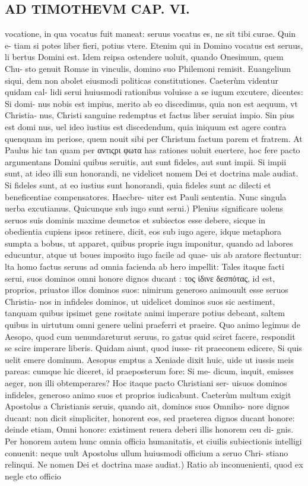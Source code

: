 \documentclass{article}
\begin{document}
\begin{pages}
\section*{AD TIMOTHEVM CAP. VI. }
\marginpar{[ p.119 ]}\pstart vocatione, in qua vocatus fuit maneat: seruus vocatus es, ne sit tibi curae. Quin e- tiam si potes liber fieri, potius vtere. Etenim qui in Domino vocatus est seruus, li bertus Domini est. Idem reipsa ostendere uoluit, quando Onesimum, quem Chu- sto genuit Romae in vinculis, domino suo Philemoni remisit. Euangelium siqui, dem non abolet eiusmodi politicas constitutiones. Caeterùm videntur quidam cal- lidi serui huiusmodi rationibus voluisse a se iugum excutere, dicentes: Si domi- nus nobis est impius, merito ab eo discedimus, quia non est aequum, vt Christia- nus, Christi sanguine redemptus et factus liber seruiat impio. Sin pius est domi nus, uel ideo iustius est discedendum, quia iniquum est agere contra quenquam im periose, quem nouit sibi per Christum factum parem et fratrem. At Paulus hic tan quam per αντιςρι φωτα has rationes uoluit euertere, hoc fere pacto argumentans Domini quibus seruitis, aut sunt fideles, aut sunt impii. Si impii sunt, at ideo illi sun honorandi, ne videlicet nomem Dei et doctrina male audiat. Si fideles sunt, at eo iustius sunt honorandi, quia fideles sunt ac dilecti et beneficentiae compensatores. Haecbre- uiter est Pauli sententia. Nunc singula uerba excutiamus.  \pend\pstart Quicunque sub iugo sunt serui.) Plenius significare uolens seruos suis dominis maxime deunctos et subiectos esse debere, sicque in obedientia cupiens ipsos retinere, dicit, eos sub iugo agere, idque metaphora sumpta a bobus, ut apparet, quibus proprie iugu imponitur, quando ad labores educuntur, atque ut boues imposito iugo facile ad quae- uis ab aratore flectuntur: lta homo factus seruus ad omnia facienda ab hero impellit: Tales itaque facti serui, suos dominos omni honore dignos ducant : τος ἰδινε δεσπότας, id est, proprios, priuatos illos dominos suos: nimirum generoso animouult esse seruos Christia- nos in infideles dominos, ut uidelicet dominos suos sic aestiment, tanquam quibus ipsimet gene rositate animi imperare potius debeant, saltem quibus in uirtutum omni genere uelini praeferri et praeire. Quo animo legimus de Aesopo, quod cum uenundareturut seruus, ro gatus quid sciret facere, respondit se scire imperare liberis. Quidam aiunt, quod iusse- rit praeconem edicere, Si quis uelit emere dominum. Aesopus emptus a Xeniade dixit huic, uide ut iussis meis pareas: cumque hic diceret, id praeposterum fore: Si me- dicum, inquit, emisses aeger, non illi obtemperares? Hoc itaque pacto Christiani ser- uisuos dominos infideles, generoso animo suos et proprios iudicabunt. Caeterùm multum exigit Apostolus a Christianis seruis, quando ait, dominos suos Omniho- nore dignos ducant: non dicit simpliciter, honorent eos, sed praeterea dignos ducant honore: deinde etiam, Omni honore: existiment reuera deberi illis honorem ceu di- gnis. Per honorem autem hunc omnia officia humanitatis, et ciuilis subiectionis intelligi conuenit: neque uult Apostolus ullum huiusmodi officium a seruo Chri- stiano relinqui.  \pend\pstart Ne nomen Dei et doctrina mase audiat.) Ratio ab inconuenienti, quod ex negle cto officio 
\end{pages}
\end{document}
